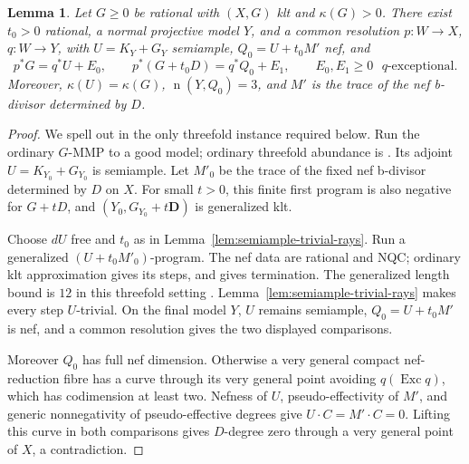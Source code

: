 \documentclass[12pt,a4paper,psamsfonts]{amsart}
\theoremstyle{definition}
\theoremstyle{plain}
\newtheorem{lemma}{Lemma}[section]
\newcommand{\nef}{\operatorname{n}}
\begin{document}
\begin{lemma}\label{lem:positive-boundary-model}
Let $G\ge0$ be rational with $(X,G)$ klt and $\kappa(G)>0$.
There exist $t_0>0$ rational, a normal projective model $Y$, and
a common resolution $p:W\to X$, $q:W\to Y$, with
$U=K_Y+G_Y$ semiample, $Q_0=U+t_0M'$ nef, and
\begin{equation}\label{eq:positive-boundary-comparison}
 p^*G=q^*U+E_0,\qquad
 p^*(G+t_0D)=q^*Q_0+E_1,
 \qquad E_0,E_1\ge0\text{ $q$-exceptional}.
\end{equation}
Moreover, $\kappa(U)=\kappa(G)$, $\nef(Y,Q_0)=3$, and $M'$
is the trace of the nef b-divisor determined by $D$.
\end{lemma}
\begin{proof}
We spell out \cite[Proposition~3.3]{NS} in the only threefold
instance required below. Run the ordinary $G$-MMP to a good
model; ordinary threefold abundance is \cite{KollarEtAl}.
Its adjoint $U=K_{Y_0}+G_{Y_0}$ is semiample. Let $M'_0$ be the
trace of the fixed nef b-divisor determined by $D$ on $X$.
For small $t>0$, this finite first program is also negative for
$G+tD$, and $(Y_0,G_{Y_0}+t\mathbf D)$ is generalized klt.


Choose $dU$ free and $t_0$ as in
Lemma~\ref{lem:semiample-trivial-rays}. Run a generalized
$(U+t_0M'_0)$-program. The nef data are rational and NQC;
ordinary klt approximation gives its steps, and
\cite[Theorem~1.2]{ChenTsakanikas} gives termination.
The generalized length bound is $12$ in this threefold setting
\cite[Lemma~3.1]{NS}. Lemma~\ref{lem:semiample-trivial-rays}
makes every step $U$-trivial.
On the final model $Y$, $U$ remains
semiample, $Q_0=U+t_0M'$ is nef, and a common resolution gives the two displayed comparisons.

Moreover $Q_0$ has full nef dimension. Otherwise a very general
compact nef-reduction fibre has a curve through its very general
point avoiding $q(\operatorname{Exc}q)$, which has codimension
at least two. Nefness of $U$, pseudo-effectivity of $M'$, and
generic nonnegativity of pseudo-effective degrees give $U\cdot C=M'\cdot C=0$.
Lifting this curve in both comparisons gives $D$-degree zero
through a very general point of $X$, a contradiction.
\end{proof}
\end{document}
